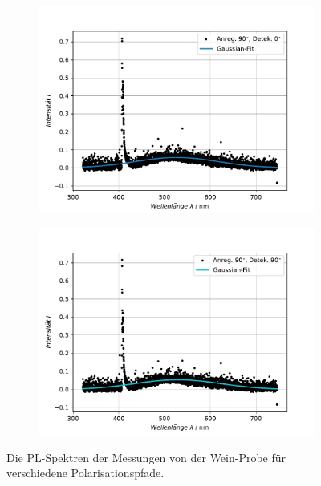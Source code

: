 \begin{figure}[hbtp]
\begin{subfigure}[t]{0.45\textwidth}
	\end{subfigure}
	\\
	\begin{subfigure}[t]{0.45\textwidth}
	\includegraphics[width=\textwidth]{Plots/aufgabe3_P3.pdf}
	\end{subfigure}
	\begin{subfigure}[t]{0.45\textwidth}
	\includegraphics[width=\textwidth]{Plots/aufgabe3_P4.pdf}
	\end{subfigure}
\caption{Die PL-Spektren der Messungen von der Wein-Probe f\"{u}r verschiedene Polarisationspfade.}
\label{abb:auf3}
\end{figure}
